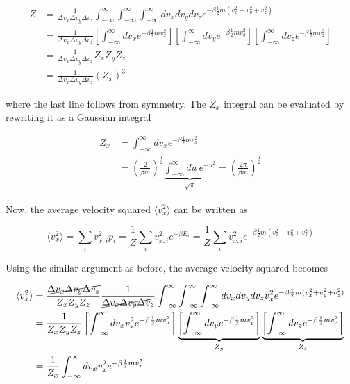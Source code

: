 \documentclass[12pt, a4paper]{article}
\begin{document}
\begin{align*}
Z&=\frac{1}{\Delta v_x \Delta v_y \Delta v_z}\int_{-\infty}^\infty\int_{-\infty}^\infty\int_{-\infty}^\infty dv_xdv_ydv_z e^{-\beta \frac{1}{2}m (v_x^2+v_y^2+v_z^2)} \\
&=\frac{1}{\Delta v_x \Delta v_y \Delta v_z}\left[ \int_{-\infty}^\infty dv_x e^{-\beta \frac{1}{2}m v_x^2} \right]\left[ \int_{-\infty}^\infty dv_y e^{-\beta \frac{1}{2}m v_y^2} \right]\left[ \int_{-\infty}^\infty dv_z e^{-\beta \frac{1}{2}m v_z^2} \right] \\
&=\frac{1}{\Delta v_x \Delta v_y \Delta v_z}Z_xZ_yZ_z \\
&=\frac{1}{\Delta v_x \Delta v_y \Delta v_z}(Z_x)^3
\end{align*}

where the last line follows from symmetry. The $Z_x$ integral can be evaluated by rewriting it as a Gaussian integral

\begin{align*}
Z_x&=\int_{-\infty}^\infty dv_x e^{-\beta \frac{1}{2}m v_x^2} \\
&=\left( \frac{2}{\beta m} \right)^{\frac12} \underbrace{\int_{-\infty}^\infty du \: e^{-u^2}}_{\sqrt{\pi}}  = \left( \frac{2\pi}{\beta m} \right)^{\frac12}
\end{align*}

Now, the average velocity squared $\langle v_x^2 \rangle$ can be written as

$$\langle v_x^2 \rangle = \sum_i v_{x,i}^2 p_i = \frac{1}{Z}\sum_i v_{x,i}^2 e^{-\beta E_i} = \frac{1}{Z}\sum_i v_{x,i}^2 e^{-\beta \frac{1}{2}m (v_x^2+v_y^2+v_z^2)}$$

Using the similar argument as before, the average velocity squared becomes

\begin{align*}
\langle v_x^2 \rangle &= \frac{\cancel{\Delta v_x \Delta v_y \Delta v_z}}{Z_xZ_yZ_z} \frac{1}{\cancel{\Delta v_x \Delta v_y \Delta v_z}} \int_{-\infty}^\infty\int_{-\infty}^\infty\int_{-\infty}^\infty dv_xdv_ydv_z v_x^2 e^{-\beta \frac{1}{2}m (v_x^2+v_y^2+v_z^2)} \\
&= \frac{1}{Z_xZ_yZ_z}\left[ \int_{-\infty}^\infty dv_x v_x^2 e^{-\beta \frac{1}{2}m v_x^2} \right]\underbrace{\left[ \int_{-\infty}^\infty dv_y e^{-\beta \frac{1}{2}m v_y^2} \right]}_{Z_y} \underbrace{\left[ \int_{-\infty}^\infty dv_z e^{-\beta \frac{1}{2}m v_z^2} \right]}_{Z_z} \\
&= \frac{1}{Z_x} \int_{-\infty}^\infty dv_x v_x^2 e^{-\beta \frac{1}{2}m v_x^2}
\end{align*}
\end{document}
